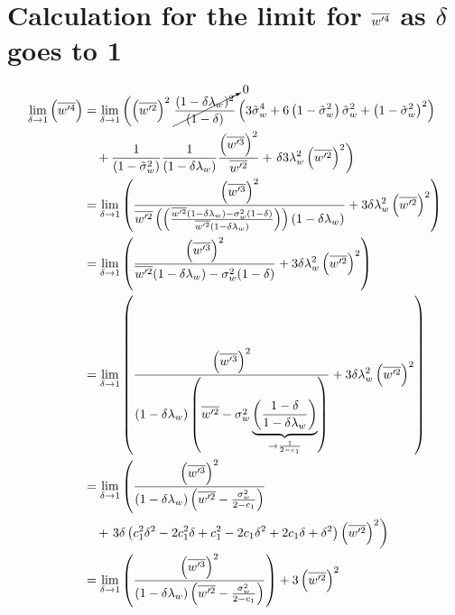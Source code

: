 \section{Calculation for the limit for \texorpdfstring{$\overline{w'^4}$}{wprime4bar} as \texorpdfstring{$\delta$}{delta} goes to 1}
\label{sec:calculation-for-the-limit-for-wprime4bar-as-delta-goes-to-1}

\begin{align}
    \label{eq:limit_wprime4_delta_to_1_calc}
    \lim_{\delta \to 1}\left(\overline{w'^4}\right)
    &= \lim_{\delta \to 1}
    \left(\left(\overline{w'^2}\right)^2\right.
    \cancelto{0}{\frac{(1-\delta \lambda_w)^2}{(1-\delta)}}
    \left(3 {\tilde{\sigma}_w}^4 + 6 \left( 1 - \tilde{\sigma}_w^2 \right) {\tilde{\sigma}_w}^2 + \left( 1 - \tilde{\sigma}_w^2 \right)^2\right) \nonumber\\
    &\quad+ \frac{1}{\left( 1 - \tilde{\sigma}_w^2 \right)} \frac{1}{(1-\delta \lambda_w)}
    \frac{\left(\overline{w'^3}\right)^2}{\overline{w'^2}}
    + \left. \delta 3 \lambda_w^2 \left(\overline{w'^2}\right)^2\right)
    \\
    &= \lim_{\delta \to 1}
    \left(
    \frac{
        \left(\overline{w'^3}\right)^2
    }
    {
        \overline{w'^2}
        \left(\left(\frac{\overline{w'^2} (1-\delta\lambda_w) - \sigma_w^2 (1-\delta)}{\overline{w'^2} (1-\delta\lambda_w)}\right)\right)
        (1-\delta \lambda_w)
    }
    + 3 \delta \lambda_w^2 \left(\overline{w'^2}\right)^2
    \right)
    \\
    &= \lim_{\delta \to 1}
    \left(
    \frac{
        \left(\overline{w'^3}\right)^2
    }{
        \overline{w'^2} (1-\delta\lambda_w) - \sigma_w^2 (1-\delta)
    }
    + 3 \delta \lambda_w^2 \left(\overline{w'^2}\right)^2
    \right)
    \\
    &= \lim_{\delta \to 1}
    \left(
    \frac{
        \left(\overline{w'^3}\right)^2
    }{
        (1-\delta\lambda_w)
        \left(\overline{w'^2} - \sigma_w^2 \underbrace{\left(\frac{1-\delta}{1-\delta\lambda_w}\right)}_{\to \frac{1}{2 - c_1}}\right)
    }
    + 3 \delta \lambda_w^2 \left(\overline{w'^2}\right)^2
    \right)
    \\
    &= \lim_{\delta \to 1}
    \left(
    \frac{
        \left(\overline{w'^3}\right)^2
    }{
        (1 - \delta\lambda_w)
        \left(\overline{w'^2} - \frac{\sigma_w^2}{2 - c_1}\right)
    }
    \right.
    \nonumber\\
    &\quad+
    \left.3 \delta \left(c_1^2\delta^2 - 2c_1^2\delta + c_1^2 - 2c_1\delta^2 + 2c_1\delta + \delta^2\right) \left(\overline{w'^2}\right)^2
    \right)
    \\
    &= \lim_{\delta \to 1}
    \left(
    \frac{
        \left(\overline{w'^3}\right)^2
    }{
        (1 - \delta\lambda_w)
        \left(\overline{w'^2} - \frac{\sigma_w^2}{2 - c_1}\right)
    }
    \right)
    + 3 \left(\overline{w'^2}\right)^2
\end{align}


